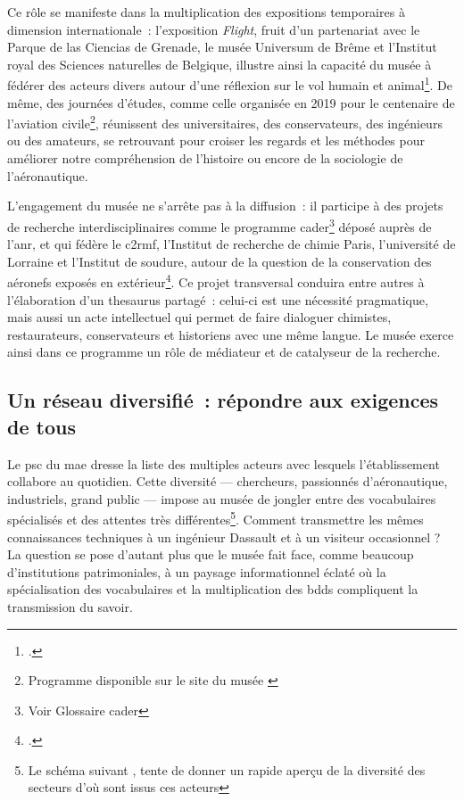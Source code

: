 Ce rôle se manifeste dans la multiplication des expositions temporaires à dimension internationale~: l’exposition \emph{Flight}, fruit d’un partenariat avec le Parque de las Ciencias de Grenade, le musée Universum de Brême et l’Institut royal des Sciences naturelles de Belgique, illustre ainsi la capacité du musée à fédérer des acteurs divers autour d’une réflexion sur le vol humain et animal\footcite{ExpositionFlight2024}. De même, des journées d’études, comme celle organisée en 2019 pour le centenaire de l’aviation civile\footnote{Programme disponible sur le site du musée \cite{19192019CentAns}}, réunissent des universitaires, des conservateurs, des ingénieurs ou des amateurs, se retrouvant pour croiser les regards et les méthodes pour améliorer notre compréhension de l'histoire ou encore de la sociologie de l'aéronautique.

L’engagement du musée ne s’arrête pas à la diffusion~: il participe à des projets de recherche interdisciplinaires comme le programme \gls{cader}\footnote{Voir Glossaire \gls{cader}} déposé auprès de l'\ac{anr}, et qui fédère le \ac{c2rmf}, l’Institut de recherche de chimie Paris, l’université de Lorraine et l’Institut de soudure, autour de la  question de la conservation des aéronefs exposés en extérieur\footcite{CADERConservationDanciens}. Ce projet transversal conduira entre autres à l’élaboration d’un \gls{thesaurus} partagé~: celui-ci est une nécessité pragmatique, mais aussi un acte intellectuel qui permet de faire dialoguer chimistes, restaurateurs, conservateurs et historiens avec une même langue. Le musée exerce ainsi dans ce programme un rôle de médiateur et de catalyseur de la recherche.

\subsection{Un réseau diversifié~: répondre aux exigences de tous}

Le \acf{psc} du \ac{mae} dresse la liste des multiples acteurs avec lesquels l'établissement collabore au quotidien. Cette diversité — chercheurs, passionnés d'aéronautique, industriels, grand public — impose au musée de jongler entre des vocabulaires spécialisés et des attentes très différentes\footnote{Le schéma suivant , tente de donner un rapide aperçu de la diversité des secteurs d'où sont issus ces acteurs}. Comment transmettre les mêmes connaissances techniques à un ingénieur Dassault et à un visiteur occasionnel ? La question se pose d'autant plus que le musée fait face, comme beaucoup d'institutions patrimoniales, à un paysage informationnel éclaté où la spécialisation des vocabulaires et la multiplication des \glspl{bdd} compliquent la transmission du savoir.

